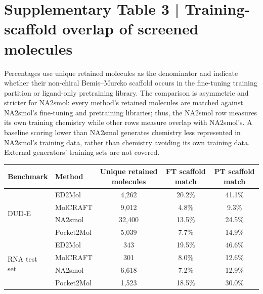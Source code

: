 \section*{Supplementary Table 3 | Training-scaffold overlap of screened molecules}
Percentages use unique retained molecules as the denominator and indicate whether their non-chiral Bemis--Murcko scaffold occurs in the fine-tuning training partition or ligand-only pretraining library. The comparison is asymmetric and stricter for NA2smol: every method's retained molecules are matched against NA2smol's fine-tuning and pretraining libraries; thus, the NA2smol row measures its own training chemistry while other rows measure overlap with NA2smol's. A baseline scoring lower than NA2smol generates chemistry less represented in NA2smol's training data, rather than chemistry avoiding its own training data. External generators' training sets are not covered.
\begin{center}\footnotesize
\setlength{\tabcolsep}{4pt}
\begin{tabular}{@{}llccc@{}}
\toprule
\textbf{Benchmark} & \textbf{Method} & \textbf{Unique retained molecules} & \textbf{FT scaffold match} & \textbf{PT scaffold match} \\
\midrule
\multirow{4}{*}{DUD-E}
  & ED2Mol     & 4,262  & 20.2\% & 41.1\% \\
  & MolCRAFT   & 9,012  & 4.8\%  & 9.3\% \\
  & NA2smol    & 32,400 & 13.5\% & 24.5\% \\
  & Pocket2Mol & 5,039  & 7.7\%  & 14.9\% \\
\midrule
\multirow{4}{*}{RNA test set}
  & ED2Mol     & 343    & 19.5\% & 46.6\% \\
  & MolCRAFT   & 301    & 8.0\%  & 12.6\% \\
  & NA2smol    & 6,618  & 7.2\%  & 12.9\% \\
  & Pocket2Mol & 1,523  & 18.5\% & 30.0\% \\
\bottomrule
\end{tabular}\end{center}

\clearpage
